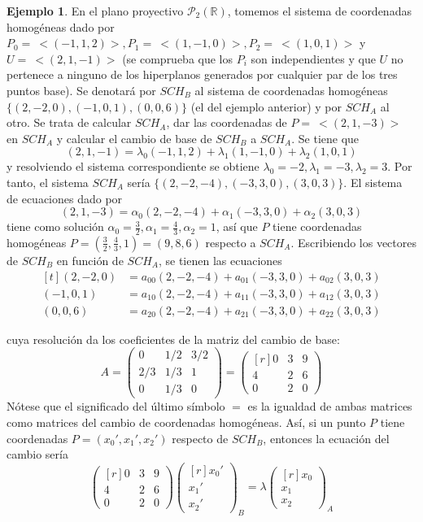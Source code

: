 \documentclass[12pt]{report}
\theoremstyle{definition}
\theoremstyle{definition}
\newtheorem{example}{Ejemplo}[chapter]
\theoremstyle{remark}
\newcommand{\R}{\mathbb R}
\begin{document}
\begin{example}
En el plano proyectivo $\mathcal{P}_2(\R)$, tomemos el sistema de coordenadas homogéneas dado por $P_0 = \ <(-1,1,2)>, P_1 = \ <(1,-1,0)>, P_2 = \ <(1,0,1)>$ y $ U = \ <(2,1,-1)>$ (se comprueba que los $P_i$ son independientes y que $U$ no pertenece a ninguno de los hiperplanos generados por cualquier par de los tres puntos base). Se denotará por $SCH_B$ al sistema de coordenadas homogéneas $\{(2,-2,0),(-1,0,1),(0,0,6)\}$ (el del ejemplo anterior) y por $SCH_A$ al otro. Se trata de calcular $SCH_A$, dar las coordenadas de $P = \ <(2,1,-3)>$ en $SCH_A$ y calcular el cambio de base de $SCH_B$ a $SCH_A$. Se tiene que
\[(2,1,-1) = \lambda_0(-1,1,2)+\lambda_1(1,-1,0)+\lambda_2(1,0,1)\]
y resolviendo el sistema correspondiente se obtiene $\lambda_0 = -2, \lambda_1 = -3, \lambda_2 = 3$. Por tanto, el sistema $SCH_A$ sería $\{(2,-2,-4),(-3,3,0),(3,0,3)\}$. El sistema de ecuaciones dado por
\[(2,1,-3) = \alpha_0(2,-2,-4)+\alpha_1(-3,3,0)+\alpha_2(3,0,3)\]
tiene como solución $\alpha_0 = \frac{3}{2}, \alpha_1 = \frac{4}{3}, \alpha_2 = 1$, así que $P$ tiene coordenadas homogéneas $P = (\frac{3}{2},\frac{4}{3},1) = (9,8,6)$ respecto a $SCH_A$. Escribiendo los vectores de $SCH_B$ en función de $SCH_A$, se tienen las ecuaciones
\[
\begin{aligned}[t]
(2,-2,0) &= a_{00}(2,-2,-4)+a_{01}(-3,3,0)+a_{02}(3,0,3) \\
(-1,0,1) &= a_{10}(2,-2,-4)+a_{11}(-3,3,0)+a_{12}(3,0,3) \\
(0,0,6) &= a_{20}(2,-2,-4)+a_{21}(-3,3,0)+a_{22}(3,0,3)  
\end{aligned}
\]

cuya resolución da los coeficientes de la matriz del cambio de base:
\[A = \begin{pmatrix*}
0 & 1/2 & 3/2 \\
 2/3 &  1/3 & 1 \\
0 & 1/3 & 0
\end{pmatrix*} = \begin{pmatrix*}[r]
0 & 3 & 9 \\
4 & 2 & 6 \\
0 & 2 & 0
\end{pmatrix*}\]
Nótese que el significado del último símbolo $=$ es la igualdad de ambas matrices como matrices del cambio de coordenadas homogéneas. Así, si un punto $P$ tiene coordenadas $P = (x_0',x_1',x_2')$ respecto de $SCH_B$, entonces la ecuación del cambio sería
\[\begin{pmatrix*}[r] 
0 & 3 & 9 \\
4 & 2 & 6 \\
0 & 2 & 0
\end{pmatrix*} \begin{pmatrix*}[r]
x_0' \\
x_1' \\
x_2'
\end{pmatrix*}_{\!\!B} = \lambda \begin{pmatrix*}[r]
x_0 \\
x_1 \\
x_2
\end{pmatrix*}_{\!\!A}\]
\end{example}
\end{document}
